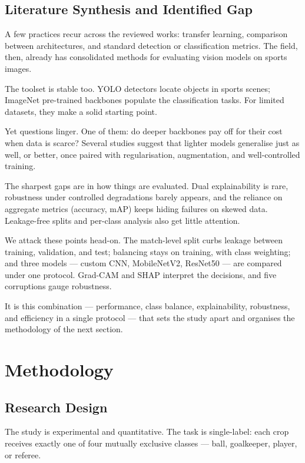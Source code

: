 \documentclass[preprint,12pt]{elsarticle}
\begin{document}
\subsection{Literature Synthesis and Identified Gap}

A few practices recur across the reviewed works: transfer learning, comparison between architectures, and standard detection or classification metrics. The field, then, already has consolidated methods for evaluating vision models on sports images.

The toolset is stable too. YOLO detectors locate objects in sports scenes; ImageNet pre-trained backbones populate the classification tasks. For limited datasets, they make a solid starting point.

Yet questions linger. One of them: do deeper backbones pay off for their cost when data is scarce? Several studies suggest that lighter models generalise just as well, or better, once paired with regularisation, augmentation, and well-controlled training.

The sharpest gaps are in how things are evaluated. Dual explainability is rare, robustness under controlled degradations barely appears, and the reliance on aggregate metrics (accuracy, mAP) keeps hiding failures on skewed data. Leakage-free splits and per-class analysis also get little attention.

We attack these points head-on. The match-level split curbs leakage between training, validation, and test; balancing stays on training, with class weighting; and three models --- custom CNN, MobileNetV2, ResNet50 --- are compared under one protocol. Grad-CAM and SHAP interpret the decisions, and five corruptions gauge robustness.

It is this combination --- performance, class balance, explainability, robustness, and efficiency in a single protocol --- that sets the study apart and organises the methodology of the next section.

\section{Methodology}
\label{sec:methodology}

\subsection{Research Design}

The study is experimental and quantitative. The task is single-label: each crop receives exactly one of four mutually exclusive classes --- ball, goalkeeper, player, or referee.
\end{document}
